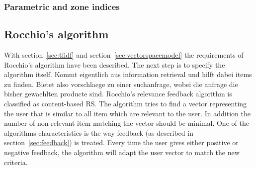 \subsubsection{Parametric and zone indices}
\label{sec:parametricandzoneindices}



\subsection{Rocchio's algorithm}
\label{sec:rocchio}
With section~\ref{sec:tfidf} and section~\ref{sec:vectorspacemodel} the requirements of Rocchio's algorithm have been described.\citep[p.~178]{manning:2009}
The next step is to specify the algorithm itself.
{\color{red} Kommt eigentlich aus information retrieval und hilft dabei items zu finden.
Bietet also vorschlaege zu einer suchanfrage, wobei die anfrage die bisher gewaehlten producte sind.}
Rocchio's relevance feedback algorithm is classified as content-based RS.\citep[p.~92]{lops:2011}
The algorithm tries to find a vector representing the user that is similar to all item which are relevant to the user.
In addition the number of non-relevant item matching the vector should be minimal.\citep[p.~178-181]{manning:2009}
One of the algorithms characteristics is the way feedback (as described in section~\ref{sec:feedback}) is treated.
Every time the user gives either positive or negative feedback, the algorithm will adapt the user vector to match the new criteria.\citep[p.~387-388]{pazzani:2007}
\\

